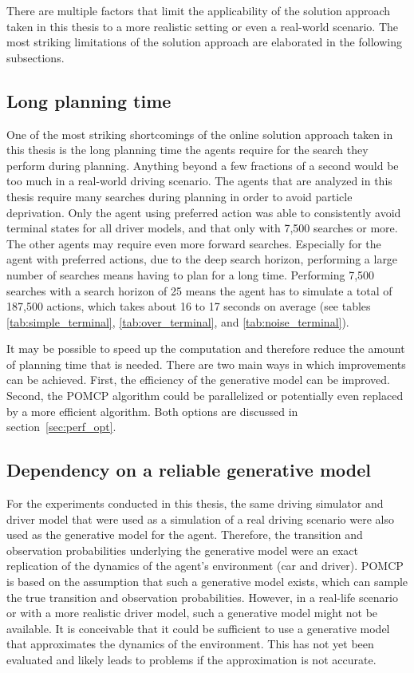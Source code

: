 There are multiple factors that limit the applicability of the solution approach taken in this thesis to a more realistic setting or even a real-world scenario. The most striking limitations of the solution approach are elaborated in the following subsections.

\subsection{Long planning time}

One of the most striking shortcomings of the online solution approach taken in this thesis is the long planning time the agents require for the search they perform during planning. Anything beyond a few fractions of a second would be too much in a real-world driving scenario. The agents that are analyzed in this thesis require many searches during planning in order to avoid particle deprivation. Only the agent using preferred action was able to consistently avoid terminal states for all driver models, and that only with 7,500 searches or more. The other agents may require even more forward searches. Especially for the agent with preferred actions, due to the deep search horizon, performing a large number of searches means having to plan for a long time. Performing 7,500 searches with a search horizon of 25 means the agent has to simulate a total of 187,500 actions, which takes about 16 to 17 seconds on average (see tables \ref{tab:simple_terminal}, \ref{tab:over_terminal}, and \ref{tab:noise_terminal}).

It may be possible to speed up the computation and therefore reduce the amount of planning time that is needed. There are two main ways in which improvements can be achieved. First, the efficiency of the generative model can be improved. Second, the POMCP algorithm could be parallelized or potentially even replaced by a more efficient algorithm. Both options are discussed in section~\ref{sec:perf_opt}. 

\subsection{Dependency on a reliable generative model}

For the experiments conducted in this thesis, the same driving simulator and driver model that were used as a simulation of a real driving scenario were also used as the generative model for the agent. Therefore, the transition and observation probabilities underlying the generative model were an exact replication of the dynamics of the agent's environment (car and driver). POMCP is based on the assumption that such a generative model exists, which can sample the true transition and observation probabilities. However, in a real-life scenario or with a more realistic driver model, such a generative model might not be available. It is conceivable that it could be sufficient to use a generative model that approximates the dynamics of the environment. This has not yet been evaluated and likely leads to problems if the approximation is not accurate.

